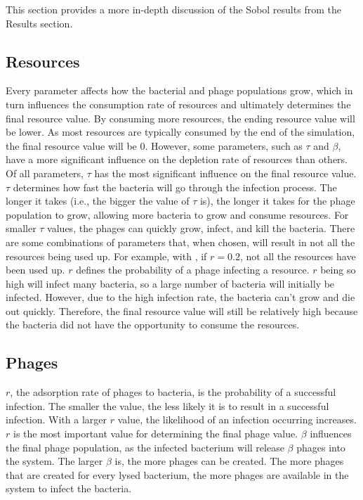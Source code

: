 This section provides a more in-depth discussion of the Sobol results from the Results section. 

\subsection{Resources}
Every parameter affects how the bacterial and phage populations grow, which in turn influences the consumption rate of resources and ultimately determines the final resource value. 
By consuming more resources, the ending resource value will be lower. 
As most resources are typically consumed by the end of the simulation, the final resource value will be 0. 
However, some parameters, such as $\tau$ and $\beta$, have a more significant influence on the depletion rate of resources than others. 
Of all parameters, $\tau$ has the most significant influence on the final resource value. 
$\tau$ determines how fast the bacteria will go through the infection process. 
The longer it takes (i.e., the bigger the value of $\tau$ is), the longer it takes for the phage population to grow, allowing more bacteria to grow and consume resources. 
For smaller $\tau$ values, the phages can quickly grow, infect, and kill the bacteria. 
There are some combinations of parameters that, when chosen, will result in not all the resources being used up. For example, with , if $r = 0.2$, not all the resources have been used up. 
$r$ defines the probability of a phage infecting a resource. 
$r$ being so high will infect many bacteria, so a large number of bacteria will initially be infected. 
However, due to the high infection rate, the bacteria can't grow and die out quickly. 
Therefore, the final resource value will still be relatively high because the bacteria did not have the opportunity to consume the resources. 

\subsection{Phages}
$r$, the adsorption rate of phages to bacteria, is the probability of a successful infection. 
The smaller the value, the less likely it is to result in a successful infection. 
With a larger $r$ value, the likelihood of an infection occurring increases. 
$r$ is the most important value for determining the final phage value. 
$\beta$ influences the final phage population, as the infected bacterium will release $\beta$ phages into the system. 
The larger $\beta$ is, the more phages can be created. 
The more phages that are created for every lysed bacterium, the more phages are available in the system to infect the bacteria. 

